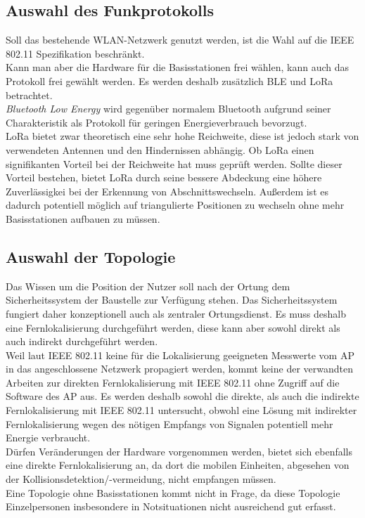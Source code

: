 \subsection{Auswahl des Funkprotokolls}
Soll das bestehende WLAN-Netzwerk genutzt werden, ist die Wahl auf die IEEE 802.11 Spezifikation beschränkt.\\
Kann man aber die Hardware für die Basisstationen frei wählen, kann auch das Protokoll frei gewählt werden.
Es werden deshalb zusätzlich BLE und LoRa betrachtet.\\
\emph{Bluetooth Low Energy} wird gegenüber normalem Bluetooth aufgrund seiner Charakteristik als Protokoll für geringen Energieverbrauch bevorzugt.\\
LoRa bietet zwar theoretisch eine sehr hohe Reichweite, diese ist jedoch stark von verwendeten Antennen und den Hindernissen abhängig.
Ob LoRa einen signifikanten Vorteil bei der Reichweite hat muss geprüft werden.
Sollte dieser Vorteil bestehen, bietet LoRa durch seine bessere Abdeckung eine höhere Zuverlässigkei bei der Erkennung von Abschnittswechseln. 
Außerdem ist es dadurch potentiell möglich auf triangulierte Positionen zu wechseln ohne mehr Basisstationen aufbauen zu müssen.

\subsection{Auswahl der Topologie}
Das Wissen um die Position der Nutzer soll nach der Ortung dem Sicherheitssystem der Baustelle zur Verfügung stehen. 
Das Sicherheitssystem fungiert daher konzeptionell auch als zentraler Ortungsdienst.
Es muss deshalb eine Fernlokalisierung durchgeführt werden, diese kann aber sowohl direkt als auch indirekt durchgeführt werden. \\
Weil laut IEEE 802.11 keine für die Lokalisierung geeigneten Messwerte vom AP in das angeschlossene Netzwerk propagiert werden, kommt keine der verwandten Arbeiten zur direkten Fernlokalisierung mit IEEE 802.11 ohne Zugriff auf die Software des AP aus.
Es werden deshalb sowohl die direkte, als auch die indirekte Fernlokalisierung mit IEEE 802.11 untersucht, obwohl eine Lösung mit indirekter Fernlokalisierung wegen des nötigen Empfangs von Signalen potentiell mehr Energie verbraucht.\\
Dürfen Veränderungen der Hardware vorgenommen werden, bietet sich ebenfalls eine direkte Fernlokalisierung an, da dort die mobilen Einheiten, abgesehen von der Kollisionsdetektion/-vermeidung, nicht empfangen müssen.\\
Eine Topologie ohne Basisstationen kommt nicht in Frage, da diese Topologie Einzelpersonen insbesondere in Notsituationen nicht ausreichend gut erfasst.




